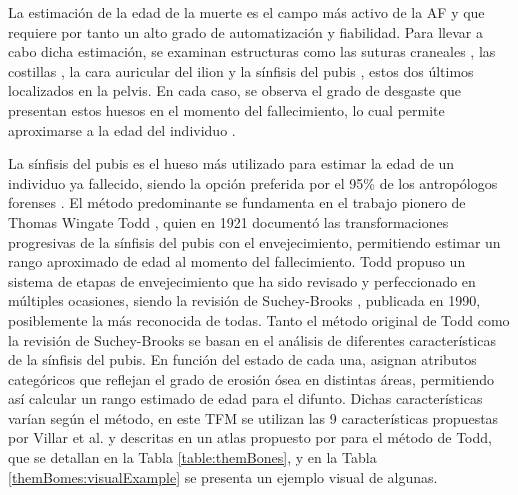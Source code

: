 La estimación de la edad de la muerte es el campo más activo de la AF \cite{ubelaker_recent_2020} y que requiere por tanto un alto grado de automatización y fiabilidad. Para llevar a cabo dicha estimación, se examinan estructuras como las suturas craneales \cite{skullAF}, las costillas \cite{icscan1984age}, la cara auricular del ilion \cite{osborne_reconsidering_2004} y la sínfisis del pubis \cite{garvin_current_2012}, estos dos últimos localizados en la pelvis. En cada caso, se observa el grado de desgaste que presentan estos huesos en el momento del fallecimiento, lo cual permite aproximarse a la edad del individuo \cite{RefWorks:RefID:12-black2011forensic}.

La sínfisis del pubis es el hueso más utilizado para estimar la edad de un individuo ya fallecido, siendo la opción preferida por el 95\% de los antropólogos forenses \cite{garvin_current_2012}. El método predominante se fundamenta en el trabajo pionero de Thomas Wingate Todd \cite{RefWorks:RefID:19-todd1921age}, quien en 1921 documentó las transformaciones progresivas de la sínfisis del pubis con el envejecimiento, permitiendo estimar un rango aproximado de edad al momento del fallecimiento. Todd propuso un sistema de etapas de envejecimiento que ha sido revisado y perfeccionado en múltiples ocasiones, siendo la revisión de Suchey-Brooks \cite{RefWorks:RefID:20-brooks1990skeletal}, publicada en 1990, posiblemente la más reconocida de todas. Tanto el método original de Todd como la revisión de Suchey-Brooks se basan en el análisis de diferentes características de la sínfisis del pubis. En función del estado de cada una, asignan atributos categóricos que reflejan el grado de erosión ósea en distintas áreas, permitiendo así calcular un rango estimado de edad para el difunto. Dichas características varían según el método, en este TFM se utilizan las 9 características propuestas por Villar et al. \cite{villar2017first} y descritas en un atlas propuesto por \cite{irurita2025pubic} para el método de Todd, que se detallan en la Tabla \ref{table:themBones}, y en la Tabla \ref{themBomes:visualExample} se presenta un ejemplo visual de algunas.

